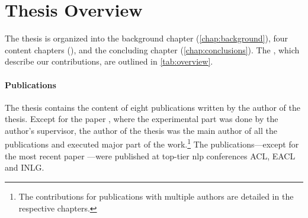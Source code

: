 \section{Thesis Overview}
\label{sec:overview}

The thesis is organized into the background chapter (\autoref{chap:background}), four content chapters (), and the concluding chapter (\autoref{chap:conclusions}). The , which describe our contributions, are outlined in \autoref{tab:overview}.

\paragraph{Publications} The thesis contains the content of eight publications written by the author of the thesis. Except for the paper \citet{dusekEvaluatingSemanticAccuracy2020}, where the experimental part was done by the author's supervisor, the author of the thesis was the main author of all the publications and executed major part of the work.\footnote{The contributions for publications with multiple authors are detailed in the respective chapters.} The publications---except for the most recent paper \citet{kasnerReferenceBasedMetricsAnalyzing2024}---were published at top-tier \ac{nlp} conferences ACL, EACL and INLG.


